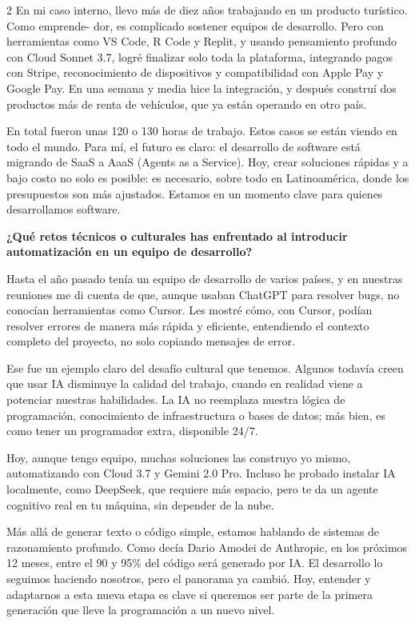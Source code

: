 \documentclass[12pt,spanish,Letterpaper,openany]{book}
\begin{document}
\begin {multicols}{2}
En mi caso interno, llevo más de diez años trabajando en un producto turístico. Como emprende-
dor, es complicado sostener equipos de desarrollo. Pero con herramientas como VS Code, R Code y Replit, y usando pensamiento profundo con Cloud Sonnet 3.7, logré finalizar solo toda la plataforma, integrando pagos con Stripe, reconocimiento de dispositivos y compatibilidad con Apple Pay y Google Pay.
En una semana y media hice la integración, y después construí dos productos más de renta de vehículos, que ya están operando en otro país.

En total fueron unas 120 o 130 horas de trabajo. Estos casos se están viendo en todo el mundo.
Para mí, el futuro es claro: el desarrollo de software está migrando de SaaS a AaaS (Agents as a Service).
Hoy, crear soluciones rápidas y a bajo costo no solo es posible: es necesario, sobre todo en Latinoamérica, donde los presupuestos son más ajustados. Estamos en un momento clave para quienes desarrollamos software.

\textbf{¿Qué retos técnicos o culturales has enfrentado al introducir automatización en un equipo de desarrollo?}

Hasta el año pasado tenía un equipo de desarrollo de varios países, y en nuestras reuniones me di cuenta de que, aunque usaban ChatGPT para resolver bugs, no conocían herramientas como Cursor. Les mostré cómo, con Cursor, podían resolver errores de manera más rápida y eficiente, entendiendo el contexto completo del proyecto, no solo copiando mensajes de error.

Ese fue un ejemplo claro del desafío cultural que tenemos. Algunos todavía creen que usar IA disminuye la calidad del trabajo, cuando en realidad viene a potenciar nuestras habilidades. La IA no reemplaza nuestra lógica de programación, conocimiento de infraestructura o bases de datos; más bien, es como tener un programador extra, disponible 24/7.

Hoy, aunque tengo equipo, muchas soluciones las construyo yo mismo, automatizando con Cloud 3.7 y Gemini 2.0 Pro. Incluso he probado instalar IA localmente, como DeepSeek, que requiere más espacio, pero te da un agente cognitivo real en tu máquina, sin depender de la nube.

Más allá de generar texto o código simple, estamos hablando de sistemas de razonamiento profundo. Como decía Dario Amodei de Anthropic, en los próximos 12 meses, entre el 90 y 95\% del código será generado por IA. El desarrollo lo seguimos haciendo nosotros, pero el panorama ya cambió.
Hoy, entender y adaptarnos a esta nueva etapa es clave si queremos ser parte de la primera generación que lleve la programación a un nuevo nivel.


\end{multicols}
\end{document}
